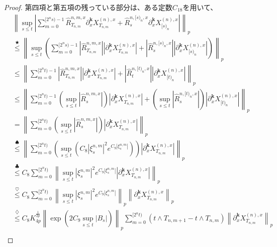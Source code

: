 \documentclass[uplatex]{jsarticle}
\theoremstyle{definition}
\begin{document}
\begin{proof}
  第四項と第五項の残っている部分は、ある定数\(C_{18}\)を用いて、
  \begin{align*}
    &\left\| \sup_{s\leq t}
    \left| \sum_{m=0}^{[2^ns)-1}
    \hat{R}_{T_{n,m}}^{n,m,x} \partial_x^{\mathbf{k}}X_{T_{n,m}}^{(n),x}
    + \hat{R}_s^{n,[s)_n,x} \partial_x^{\mathbf{k}}X_{[s)_n}^{(n),x}
    \right| \right\|_p \\
    &\overset{\bigstar}{\leq} \left\|
    \sup_{s\leq t} \left(
    \sum_{m=0}^{[2^ns)-1}
    \left| \hat{R}_{T_{n,m}}^{n,m,x} \right|
    \left| \partial_x^{\mathbf{k}}X_{T_{n,m}}^{(n),x}\right|
    + \left| \hat{R}_s^{n,[s)_n,x} \right|
    \left| \partial_x^{\mathbf{k}}X_{[s)_n}^{(n),x} \right| \right) \right\|_p \\
    &\leq \left\| \sum_{m=0}^{[2^nt)-1}
    \left| \hat{R}_{T_{n,m}}^{n,m,x} \right|
    \left| \partial_x^{\mathbf{k}}X_{T_{n,m}}^{(n),x}\right|
    + \left| \hat{R}_t^{n,[t)_n,x} \right|
    \left| \partial_x^{\mathbf{k}}X_{[t)_n}^{(n),x} \right| \right\|_p \\
    &\leq \left\| \sum_{m=0}^{[2^nt)-1}
    \left( \sup_{s\leq t}\left| \hat{R}_s^{n,m,x} \right| \right)
    \left| \partial_x^{\mathbf{k}}X_{T_{n,m}}^{(n),x}\right|
    + \left( \sup_{s\leq t} \left| \hat{R}_s^{n,[t)_n,x} \right| \right)
    \left| \partial_x^{\mathbf{k}}X_{[t)_n}^{(n),x} \right| \right\|_p \\
    &= \left\| \sum_{m=0}^{[2^nt)}
    \left( \sup_{s\leq t} \left| \hat{R}_s^{n,m,x} \right| \right)
    \left| \partial_x^{\mathbf{k}}X_{T_{n,m}}^{(n),x}\right| \right\|_p \\
    &\overset{\spadesuit}{\leq} \left\| \sum_{m=0}^{[2^nt)}
    \left( \sup_{s\leq t} \left( C_8|\xi_s^{n,m}|^2e^{C_9|\xi_s^{n,m}|}
    \right) \right)
    \left| \partial_x^{\mathbf{k}}X_{T_{n,m}}^{(n),x}\right| \right\|_p \\
    &\overset{\clubsuit}{\leq} C_8 \sum_{m=0}^{[2^nt)}
    \left\| \sup_{s\leq t} |\xi_s^{n,m}|^2 e^{C_9|\xi_s^{n,m}|}
    \left| \partial_x^{\mathbf{k}}X_{T_{n,m}}^{(n),x}\right| \right\|_p \\
    &\overset{\heartsuit}{\leq} C_8 \sum_{m=0}^{[2^nt)}
    \left\| \sup_{s\leq t} |\xi_s^{n,m}|^2 e^{C_9|\xi_s^{n,m}|} \right\|_p
    \left\| \partial_x^{\mathbf{k}}X_{T_{n,m}}^{(n),x} \right\|_p \\
    &\overset{\diamondsuit}{\leq} C_8 K_{4p}^{\frac{1}{2p}}
    \left\| \exp\left( 2C_9\sup_{s\leq t}|B_s|\right) \right\|_p
    \sum_{m=0}^{[2^nt)} \left( t\wedge T_{n,m+1} - t\wedge T_{n,m} \right)
    \left\| \partial_x^{\mathbf{k}}X_{T_{n,m}}^{(n),x} \right\|_p \\

\end{align*}
\end{proof}
\end{document}
